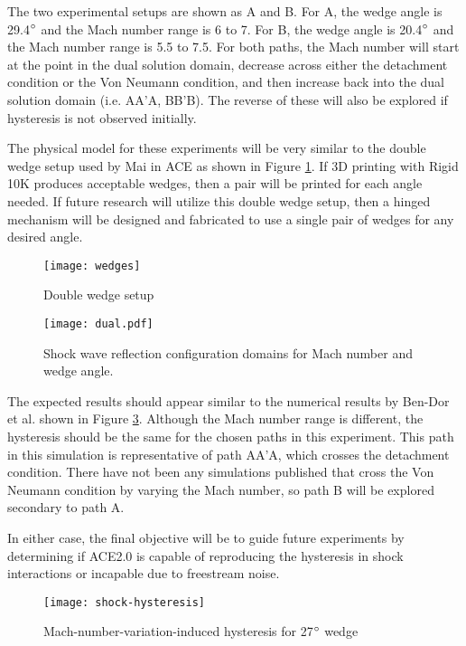 The two experimental setups are shown as A and B. For A, the wedge angle is 29.4$\degree$ and the Mach number range is 6 to 7. For B, the wedge angle is 20.4$\degree$ and the Mach number range is 5.5 to 7.5. For both paths, the Mach number will start at the point in the dual solution domain, decrease across either the detachment condition or the Von Neumann condition, and then increase back into the dual solution domain (i.e. AA'A, BB'B). The reverse of these will also be explored if hysteresis is not observed initially.

The physical model for these experiments will be very similar to the double wedge setup used by Mai \cite{mai-dis} in ACE as shown in Figure \ref{fig:wedges}. If 3D printing with Rigid 10K produces acceptable wedges, then a pair will be printed for each angle needed. If future research will utilize this double wedge setup, then a hinged mechanism will be designed and fabricated to use a single pair of wedges for any desired angle.

\begin{figure}[ht!]
    \centering
    \texttt{[image: wedges]}
    \caption[Double wedge setup]{Double wedge setup \cite{mai-dis}}
    \label{fig:wedges}
\end{figure}


\begin{figure}[ht!]
    \centering
    \texttt{[image: dual.pdf]}
    \caption{Shock wave reflection configuration domains for Mach number and wedge angle.}
    \label{fig:dual}
\end{figure}

The expected results should appear similar to the numerical results by Ben-Dor et al. \cite{ben-dor-1} shown in Figure \ref{fig:shock-hysteresis}. Although the Mach number range is different, the hysteresis should be the same for the chosen paths in this experiment. This path in this simulation is representative of path AA'A, which crosses the detachment condition. There have not been any simulations published that cross the Von Neumann condition by varying the Mach number, so path B will be explored secondary to path A.

In either case, the final objective will be to guide future experiments by determining if ACE2.0 is capable of reproducing the hysteresis in shock interactions or incapable due to freestream noise. 

\begin{figure}[ht!]
    \centering
    \texttt{[image: shock-hysteresis]}
    \caption[Mach-number-varitation-induced hysteresis for 27$\degree$ wedge]{Mach-number-variation-induced hysteresis for 27$\degree$ wedge \cite{ben-dor-1}}
    \label{fig:shock-hysteresis}
\end{figure}



